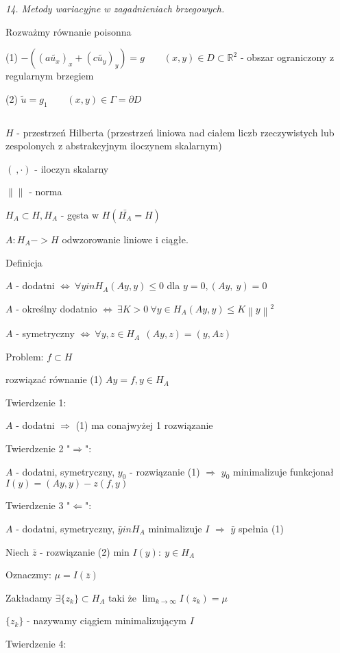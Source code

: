 \textit{14. Metody wariacyjne w zagadnieniach brzegowych.}

Rozważmy równanie poisonna

(1) $-((a\tilde{u_x})_x + (c\tilde{u_y})_y) = g\ \ \ \ \ \ \ \ \ (x,y) \in D \subset \mathbb{R}^2$ - obszar ograniczony z regularnym brzegiem

(2) $\tilde{u} = g_1\ \ \ \ \ \ \ \ \ (x,y) \in \Gamma = \partial D$

$\ $

$H$ - przestrzeń Hilberta (przestrzeń liniowa nad ciałem liczb rzeczywistych lub zespolonych z abstrakcyjnym iloczynem skalarnym)

$(\ ,\cdot)$ - iloczyn skalarny

$\left \|  \right \|$ - norma

$H_A \subset H, H_A$ - gęsta w $H (\bar{H_A} = H)$

$A: H_A -> H$ odwzorowanie liniowe i ciągłe.

Definicja

$A$ - dodatni $\Leftrightarrow\ \forall y in H_A (Ay,y) \leqslant 0$    dla $y = 0, (Ay,\ y) = 0$

$A$ - określny dodatnio $\Leftrightarrow\ \exists K > 0\ \forall y \in H_A (Ay,y) \leqslant K \left \| y \right \| ^ 2$

$A$ - symetryczny $\Leftrightarrow\ \forall y,z \in H_A\ \ (Ay,z) = (y,Az)$

Problem: $f \subset H$

    rozwiązać równanie (1) $Ay=f, y \in H_A$
    
Twierdzenie 1:

$A$ - dodatni $\Rightarrow$ (1) ma conajwyżej 1 rozwiązanie

Twierdzenie 2 "$\Rightarrow$":

$A$ - dodatni, symetryczny, $y_0$ - rozwiązanie (1) $\Rightarrow$ $y_0$ minimalizuje funkcjonał $I(y) = (Ay,y) - z(f,y)$

Twierdzenie 3 "$\Leftarrow$":

$A$ - dodatni, symetryczny, $\bar{y} in H_A$ minimalizuje $I$ $\Rightarrow$ $\bar{y}$ spełnia (1)


Niech $\bar{z}$ - rozwiązanie (2) min ${ I(y):\ y \in H_A}$

Oznaczmy: $\mu = I(\bar{z})$

Zakładamy $\exists \{z_k\} \subset H_A$ taki że $\lim_{k \to \infty} I(z_k) = \mu$

$\{z_k\}$ - nazywamy ciągiem minimalizującym $I$

Twierdzenie 4:

